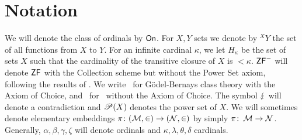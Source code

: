 \documentclass[../main]{subfiles}
\begin{document}
\chapter{Notation}
\thispagestyle{fancy}

\setlength{\parindent}{18pt}
\begin{onehalfspacing}

We will denote the class of ordinals by $\textsf{On}$. For $X,Y$ sets we denote by ${^X}Y$ the set of all functions from $X$ to $Y$. For an infinite cardinal $\kappa$, we let $H_\kappa$ be the set of sets $X$ such that the cardinality of the transitive closure of $X$ is ${<}\kappa$. $\textsf{ZF}^-$ will denote $\textsf{ZF}$ with the Collection scheme but without the Power Set axiom, following the results of \cite{ZFwithoutPowerSet}. We write \gbc\ for G\"odel-Bernays class theory with the Axiom of Choice, and \gb\ for \gbc\ without the Axiom of Choice. The symbol $\operatorname{\lightning}$ will denote a contradiction and $\mathscr P(X)$ denotes the power set of $X$. We will sometimes denote elementary embeddings $\pi\colon(\operatorname{\mathcal M},\in)\to(\operatorname{\mathcal N},\in)$ by simply $\pi\colon\operatorname{\mathcal M}\to\operatorname{\mathcal N}$. Generally, $\alpha,\beta,\gamma,\zeta$ will denote ordinals and $\kappa,\lambda,\theta,\delta$ cardinals.

\end{onehalfspacing}
\setlength{\parindent}{0pt}
\end{document}
